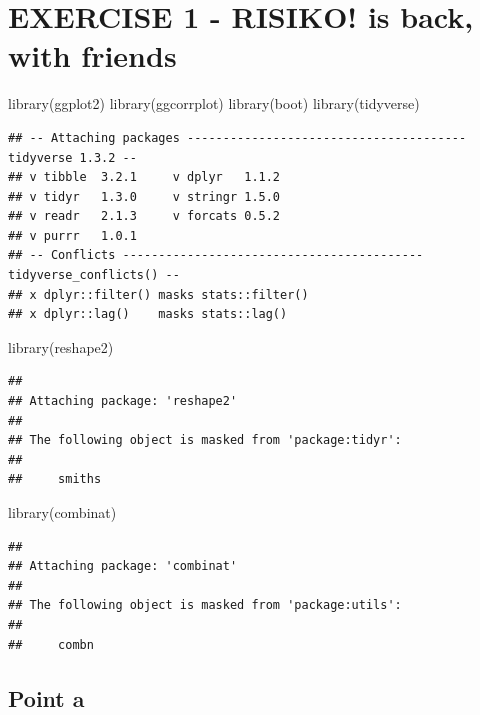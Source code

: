 \documentclass[
]{article}
\newenvironment{Shaded}{\begin{snugshade}}{\end{snugshade}}
\newcommand{\FunctionTok}[1]{\textcolor[rgb]{0.00,0.00,0.00}{#1}}
\newcommand{\NormalTok}[1]{#1}
\begin{document}
\hypertarget{exercise-1---risiko-is-back-with-friends-1}{%
\section{EXERCISE 1 - RISIKO! is back, with
friends}\label{exercise-1---risiko-is-back-with-friends-1}}

\begin{Shaded}
\begin{Highlighting}[]
\FunctionTok{library}\NormalTok{(ggplot2)}
\FunctionTok{library}\NormalTok{(ggcorrplot)}
\FunctionTok{library}\NormalTok{(boot)}
\FunctionTok{library}\NormalTok{(tidyverse)}
\end{Highlighting}
\end{Shaded}

\begin{verbatim}
## -- Attaching packages --------------------------------------- tidyverse 1.3.2 --
## v tibble  3.2.1     v dplyr   1.1.2
## v tidyr   1.3.0     v stringr 1.5.0
## v readr   2.1.3     v forcats 0.5.2
## v purrr   1.0.1     
## -- Conflicts ------------------------------------------ tidyverse_conflicts() --
## x dplyr::filter() masks stats::filter()
## x dplyr::lag()    masks stats::lag()
\end{verbatim}

\begin{Shaded}
\begin{Highlighting}[]
\FunctionTok{library}\NormalTok{(reshape2)}
\end{Highlighting}
\end{Shaded}

\begin{verbatim}
## 
## Attaching package: 'reshape2'
## 
## The following object is masked from 'package:tidyr':
## 
##     smiths
\end{verbatim}

\begin{Shaded}
\begin{Highlighting}[]
\FunctionTok{library}\NormalTok{(combinat)}
\end{Highlighting}
\end{Shaded}

\begin{verbatim}
## 
## Attaching package: 'combinat'
## 
## The following object is masked from 'package:utils':
## 
##     combn
\end{verbatim}

\hypertarget{point-a-1}{%
\subsection{Point a}\label{point-a-1}}
\end{document}
